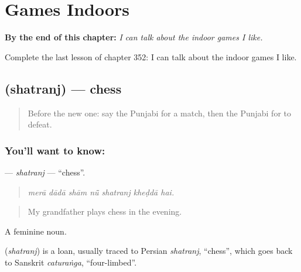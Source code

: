 
\chapter{Games Indoors}
\label{ch:pa-a2-games-indoors}

\begin{chapteropening}
\textbf{By the end of this chapter:} \emph{I can talk about the indoor games I like.}

Complete the last lesson of chapter 352: I can talk about the indoor games I like.
\end{chapteropening}

\section[\texorpdfstring{\pa{ਸ਼ਤਰੰਜ} (shatranj)}{ਸ਼ਤਰੰਜ (shatranj)}]{ (shatranj) — chess}

\label{lesson:PA-C352-shatranj}



\begin{quote}
Before the new one: say the Punjabi for a match, then the Punjabi for to defeat.
\end{quote}

\subsection*{You'll want to know: }
\textbf{} — \emph{shatranj} — \textquotedblleft{}chess\textquotedblright{}.

\begin{quote}
      
\end{quote}

\begin{quote}
\emph{merā dādā shām nū̃ shatranj kheḍdā hai.}
\end{quote}

\begin{quote}
My grandfather plays chess in the evening.
\end{quote}

A feminine noun.

\begin{cousinweb}
\textbf{} (\emph{shatranj}) is a loan, usually traced to Persian \emph{shatranj}, \textquotedblleft{}chess\textquotedblright{}, which goes back to Sanskrit \emph{caturaṅga}, \textquotedblleft{}four-limbed\textquotedblright{}.
\end{cousinweb}

